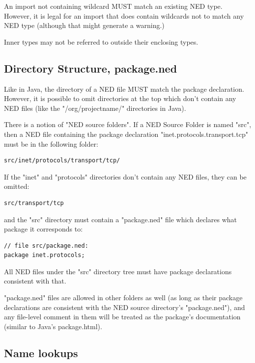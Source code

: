 An import not containing wildcard MUST match an existing NED type.
However, it is legal for an import that does contain wildcards
not to match any NED type (although that might generate a warning.)

Inner types may not be referred to outside their enclosing types.


\subsection{Directory Structure, package.ned}

Like in Java, the directory of a NED file MUST match the package declaration.
However, it is possible to omit directories at the top which don't
contain any NED files (like the "/org/projectname/" directories in Java).

There is a notion of "NED source folders". If a NED Source Folder is
named "src", then a NED file containing the package declaration
"inet.protocols.transport.tcp" must be in the following folder:

\begin{Verbatim}[commandchars=\\\{\}]
src/inet/protocols/transport/tcp/
\end{Verbatim}

If the "inet" and "protocols" directories don't contain any NED files,
they can be omitted:

\begin{Verbatim}[commandchars=\\\{\}]
src/transport/tcp
\end{Verbatim}

and the "src" directory must contain a "package.ned" file which declares
what package it corresponds to:

\begin{Verbatim}[commandchars=\\\{\}]
// file src/package.ned:
package inet.protocols;
\end{Verbatim}

All NED files under the "src" directory tree must have package
declarations consistent with that.

"package.ned" files are allowed in other folders as well (as long as
their package declarations are consistent with the NED source
directory's "package.ned"), and any file-level comment in them
will be treated as the package's documentation (similar to Java's
package.html).


\subsection{Name lookups}

